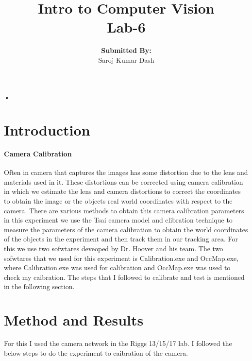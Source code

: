 \documentclass{article}
\title{\textbf{Intro to Computer Vision \\Lab-6}\vfill{}}
\author{\textbf{Submitted By:}\\Saroj Kumar Dash}
\begin{document}
	\begin{titlepage}
		\maketitle
	\end{titlepage}
	
\newpage

\tableofcontents

\newpage	

\textsl{•}\section{Introduction}
\paragraph{Camera Calibration}
Often in camera that captures the images has some distortion due to the lens and materials used in it. These distortions can be corrected using camera calibration in which we estimate the lens and camera distortions to correct the coordinates to obtain the image or the objects real world coordinates with respect to the camera. There are various methods to obtain this camera calibration parameters in this experiment we use the Tsai camera model and clibration technique to measure the parameters of the camera calibration to obtain the world coordinates of the objects in the experiment and then track them in our tracking area. For this we use two sofwtares deveoped by Dr. Hoover and his team. The two sofwtares that we used for this experiment is Calibration.exe and OccMap.exe, where Calibration.exe was used for calibration and OccMap.exe was used to check my caibration. The steps that I followed to calibrate and test is mentioned in the following section.

\section{Method and Results}
For this I used the camera network in the Riggs 13/15/17 lab. I followed the below steps to do the experiment to caibration of the camera.
\end{document}
